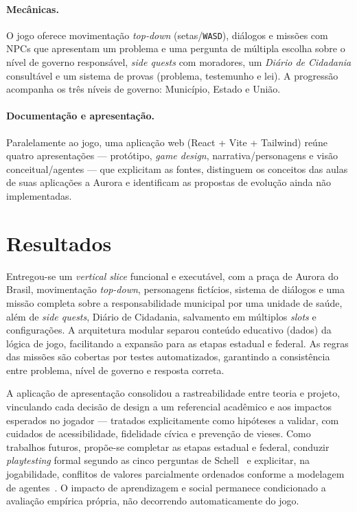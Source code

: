 \documentclass[10pt,twocolumn]{article}
\begin{document}
\paragraph{Mec\^anicas.} O jogo oferece movimenta\c{c}\~ao \emph{top-down}
(setas/\texttt{WASD}), di\'alogos e miss\~oes com NPCs que apresentam um problema e uma
pergunta de m\'ultipla escolha sobre o n\'ivel de governo respons\'avel, \emph{side
quests} com moradores, um \emph{Di\'ario de Cidadania} consult\'avel e um sistema de
provas (problema, testemunho e lei). A progress\~ao acompanha os tr\^es n\'iveis de
governo: Munic\'ipio, Estado e Uni\~ao.

\paragraph{Documenta\c{c}\~ao e apresenta\c{c}\~ao.} Paralelamente ao jogo, uma aplica\c{c}\~ao
web (React + Vite + Tailwind) re\'une quatro apresenta\c{c}\~oes --- prot\'otipo,
\emph{game design}, narrativa/personagens e vis\~ao conceitual/agentes --- que
explicitam as fontes, distinguem os conceitos das aulas de suas aplica\c{c}\~oes a
Aurora e identificam as propostas de evolu\c{c}\~ao ainda n\~ao implementadas.

\section{Resultados}

Entregou-se um \emph{vertical slice} funcional e execut\'avel, com a pra\c{c}a de
Aurora do Brasil, movimenta\c{c}\~ao \emph{top-down}, personagens fict\'icios, sistema de
di\'alogos e uma miss\~ao completa sobre a responsabilidade municipal por uma unidade
de sa\'ude, al\'em de \emph{side quests}, Di\'ario de Cidadania, salvamento em m\'ultiplos
\emph{slots} e configura\c{c}\~oes. A arquitetura modular separou conte\'udo educativo
(dados) da l\'ogica de jogo, facilitando a expans\~ao para as etapas estadual e federal.
As regras das miss\~oes s\~ao cobertas por testes automatizados, garantindo a
consist\^encia entre problema, n\'ivel de governo e resposta correta.

A aplica\c{c}\~ao de apresenta\c{c}\~ao consolidou a rastreabilidade entre teoria e projeto,
vinculando cada decis\~ao de design a um referencial acad\^emico e aos impactos
esperados no jogador --- tratados explicitamente como hip\'oteses a validar, com
cuidados de acessibilidade, fidelidade c\'ivica e preven\c{c}\~ao de vieses. Como
trabalhos futuros, prop\~oe-se completar as etapas estadual e federal, conduzir
\emph{playtesting} formal segundo as cinco perguntas de Schell~\cite{schell} e
explicitar, na jogabilidade, conflitos de valores parcialmente ordenados conforme a
modelagem de agentes~\cite{silva}. O impacto de aprendizagem e social permanece
condicionado a avalia\c{c}\~ao emp\'irica pr\'opria, n\~ao decorrendo automaticamente do jogo.

\balance
\printbibliography[title={Refer\^encias}]
\end{document}
